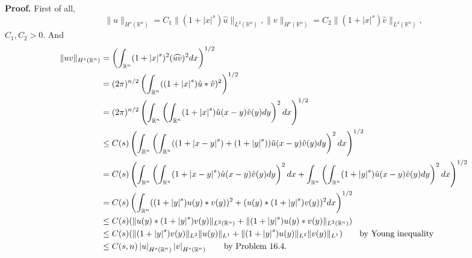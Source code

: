 \documentclass[a4paper]{book}
\newenvironment{eproof}
{\noindent\textbf{Proof.}}
{\qedhere}
\numberwithin{equation}{chapter}
\theoremstyle{definition}
\begin{document}
\begin{eproof}
  First of all,
  \[\|u \|_{H^s(\mathbb{R}^n)} = C_1 \|(1 + \left| x \right|^s)\hat{u} \|_{L^2(\mathbb{R}^n)},
    \|v \|_{H^s(\mathbb{R}^n)} = C_2 \|(1 + \left| x \right|^s)\hat{v} \|_{L^2(\mathbb{R}^n)},\]
  $C_1,C_2 > 0$. And
  \begin{align*}
    \|uv \|_{H^s(\mathbb{R}^n)} &= \left( \int_{\mathbb{R}^n}(1 + \left| x \right|^s)^2(\widehat{uv})^2 dx \right)^{1/2} \\
                                &= (2\pi)^{n/2}\left( \int_{\mathbb{R}^n} ((1 + \left| x \right|^s) \hat{u} * \hat{v})^2 \right)^{1/2} \\
                                &= (2\pi)^{n/2}\left( \int_{\mathbb{R}^n} \left(\int_{\mathbb{R}^n} (1 + \left| x \right|^s) \hat{u}(x - y) \hat{v}(y)dy  \right)^2 dx \right)^{1/2} \\
                                &\leq C(s)\left( \int_{\mathbb{R}^n} \left(\int_{\mathbb{R}^n} ((1 + \left| x - y \right|^s) + ( 1 + \left| y \right|^s) ) \hat{u}(x - y) \hat{v}(y)dy  \right)^2 dx \right)^{1/2} \\
                                &= C(s) \left( \int_{\mathbb{R}^n} \left(\int_{\mathbb{R}^n} (1 + \left| x - y \right|^s) \hat{u}(x - y) \hat{v}(y)dy  \right)^2 dx  + \int_{\mathbb{R}^n} \left(\int_{\mathbb{R}^n} (1 + \left| y \right|^s) \hat{u}(x - y) \hat{v}(y)dy  \right)^2 dx \right)^{1/2} \\
                                &= C(s) \left(\int_{\mathbb{R}^n}  ((1 + \left| y \right|^s) u(y) * v(y) )^2 +  (u(y) * (1 + \left| y \right|^s) v(y))^2  dx \right)^{1/2} \\
                                &\leq C(s)  (\| u(y) * (1 + \left| y \right|^s) v(y) \|_{L^2(\mathbb{R}^n)} + \| (1 + \left| y \right|^s) u(y) * v(y) \|_{L^2(\mathbb{R}^n)})\\
                                & \leq C(s) (\|(1 + \left| y \right|^s) v(y) \|_{L^2} \|u(y) \|_{L^1} + \|(1 + \left| y \right|^s) u(y) \|_{L^2} \|v(y) \|_{L^1} )  \qquad \textmd{by Young inequality} \\
                                &\leq C(s,n) \left| u \right|_{H^s(\mathbb{R}^n)} \left| v \right|_{H^s(\mathbb{R}^n)} \qquad \textmd{by Problem 16.4}.
  \end{align*}
\end{eproof}

%   

%   

%   


\end{document}
